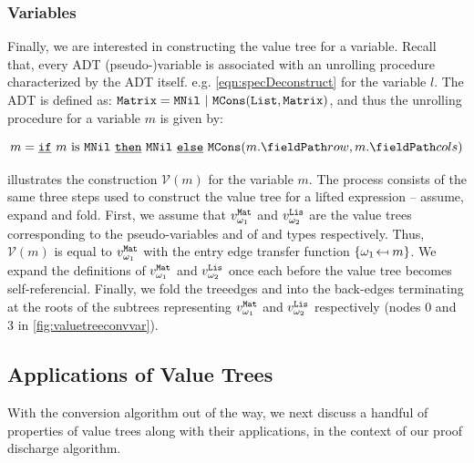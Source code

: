 \subsubsection{Variables}
Finally, we are interested in constructing the value tree for a variable.
Recall that, every ADT (pseudo-)variable is associated with an unrolling procedure
characterized by the ADT itself. e.g. \cref{eqn:specDeconstruct}
for the  variable $l$.
The  ADT is defined as:
${\tt Matrix} = {\tt MNil} \ | \ {\tt MCons}({\tt List},{\tt Matrix})$,
and thus the unrolling procedure for a  variable $m$ is given by:

\begin{equation}
\label{matrixunrollingprocedure}
m = \sumIf{\sumIs{m}{MNil}} \  \sumThen{\cons{MNil}} \  \sumElse{\cons{MCons}(\prodAccess{m}{row}, \prodAccess{m}{cols})}
\end{equation}

 illustrates the construction $\mathcal{V}(m)$ for the  variable $m$.
The process consists of the same three steps used to construct the value tree
for a lifted expression -- assume, expand and fold.
First, we assume that $v_{\omega_{1}\!}^{\tt Mat}$ and $v_{\omega_{2}\!}^{\tt Lis}$ are the value trees
corresponding to the pseudo-variables  and  of  and 
types respectively.
Thus, $\mathcal{V}(m)$ is equal to $v_{\omega_{1}\!}^{\tt Mat}$ with the entry edge transfer function
$\{ {\omega_{1}\!} \mapsfrom m \}$.
We expand the definitions of $v_{\omega_{1}\!}^{\tt Mat}$ and $v_{\omega_{2}\!}^{\tt Lis}$ once each before
the value tree becomes self-referencial.
Finally, we fold the treeedges  and  into the back-edges
terminating at the roots of the subtrees representing $v_{\omega_{1}\!}^{\tt Mat}$ and $v_{\omega_{2}\!}^{\tt Lis}$
respectively (nodes 0 and 3 in \cref{fig:valuetreeconvvar}).

\subsection{Applications of Value Trees}
\label{sec:valuetreeapps}
With the conversion algorithm out of the way, we next discuss a handful of properties of value trees along with
their applications, in the context of our proof discharge algorithm.

